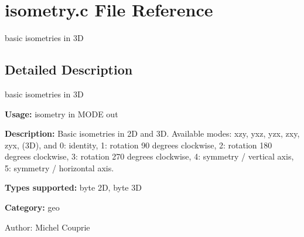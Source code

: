 \section{isometry.c File Reference}
\label{isometry_8c}
basic isometries in 3D 



\subsection{Detailed Description}
basic isometries in 3D 

{\bf Usage:} isometry in MODE out

{\bf Description:} Basic isometries in 2D and 3D. Available modes: xzy, yxz, yzx, zxy, zyx, (3D), and 0: identity, 1: rotation 90 degrees clockwise, 2: rotation 180 degrees clockwise, 3: rotation 270 degrees clockwise, 4: symmetry / vertical axis, 5: symmetry / horizontal axis.

{\bf Types supported:} byte 2D, byte 3D

{\bf Category:} geo

\begin{Desc}
\item[Author:]Michel Couprie \end{Desc}

